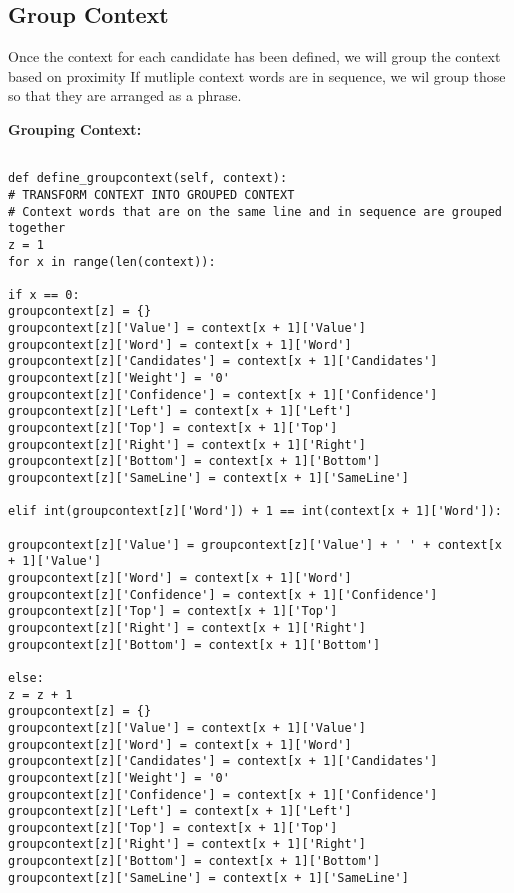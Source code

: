 \subsection{Group Context}

Once the context for each candidate has been
defined, we will group the context based on proximity
If mutliple context words are in sequence, we wil group 
those so that they are arranged as a phrase.

\bigskip
\noindent
\textbf{Grouping Context:}
\begin{footnotesize}
\begin{verbatim}

def define_groupcontext(self, context):
# TRANSFORM CONTEXT INTO GROUPED CONTEXT
# Context words that are on the same line and in sequence are grouped together
z = 1
for x in range(len(context)):

if x == 0:
groupcontext[z] = {}
groupcontext[z]['Value'] = context[x + 1]['Value']
groupcontext[z]['Word'] = context[x + 1]['Word']
groupcontext[z]['Candidates'] = context[x + 1]['Candidates']
groupcontext[z]['Weight'] = '0'
groupcontext[z]['Confidence'] = context[x + 1]['Confidence']
groupcontext[z]['Left'] = context[x + 1]['Left']
groupcontext[z]['Top'] = context[x + 1]['Top']
groupcontext[z]['Right'] = context[x + 1]['Right']
groupcontext[z]['Bottom'] = context[x + 1]['Bottom']
groupcontext[z]['SameLine'] = context[x + 1]['SameLine']

elif int(groupcontext[z]['Word']) + 1 == int(context[x + 1]['Word']):

groupcontext[z]['Value'] = groupcontext[z]['Value'] + ' ' + context[x + 1]['Value']
groupcontext[z]['Word'] = context[x + 1]['Word']
groupcontext[z]['Confidence'] = context[x + 1]['Confidence']
groupcontext[z]['Top'] = context[x + 1]['Top']
groupcontext[z]['Right'] = context[x + 1]['Right']
groupcontext[z]['Bottom'] = context[x + 1]['Bottom']

else:
z = z + 1
groupcontext[z] = {}
groupcontext[z]['Value'] = context[x + 1]['Value']
groupcontext[z]['Word'] = context[x + 1]['Word']
groupcontext[z]['Candidates'] = context[x + 1]['Candidates']
groupcontext[z]['Weight'] = '0'
groupcontext[z]['Confidence'] = context[x + 1]['Confidence']
groupcontext[z]['Left'] = context[x + 1]['Left']
groupcontext[z]['Top'] = context[x + 1]['Top']
groupcontext[z]['Right'] = context[x + 1]['Right']
groupcontext[z]['Bottom'] = context[x + 1]['Bottom']
groupcontext[z]['SameLine'] = context[x + 1]['SameLine']

\end{verbatim}
\end{footnotesize}

